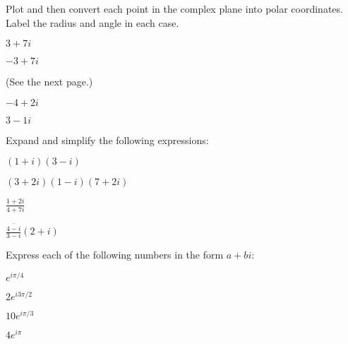 

\begin{problem}
\item Plot and then convert each point in the complex plane into polar
  coordinates. Label the radius and angle in each case.

  \begin{subproblem}
  \item $3+7i$
    \vfill

  \item $-3+7i$
    \vfill

    (See the next page.)
    \clearpage

  \item $-4+2i$
    \vfill

  \item $3-1i$
    \vfill

  \end{subproblem}
\end{problem}


  \begin{problem}
  \item Expand and simplify the following expressions:
    \begin{subproblem}
      \item $(1+i)(3-i)$
        \vfill

      \item $(3+2i)(1-i)(7+2i)$
        \vfill

      \item $\frac{1+2i}{4+7i}$
        \vfill

      \item $\frac{\bar{4-i}}{3-i}(2+i)$
        \vfill

    \end{subproblem}

    \clearpage

  \item Express each of the following numbers in the form $a+bi$:
    \begin{subproblem}
    \item $e^{i\pi/4}$
      \vfill
    \item $2e^{i 3\pi/2}$
      \vfill
    \item $10e^{i \pi/3}$
      \vfill
    \item $4e^{i \pi}$
      \vfill
    \end{subproblem}


  \end{problem}


